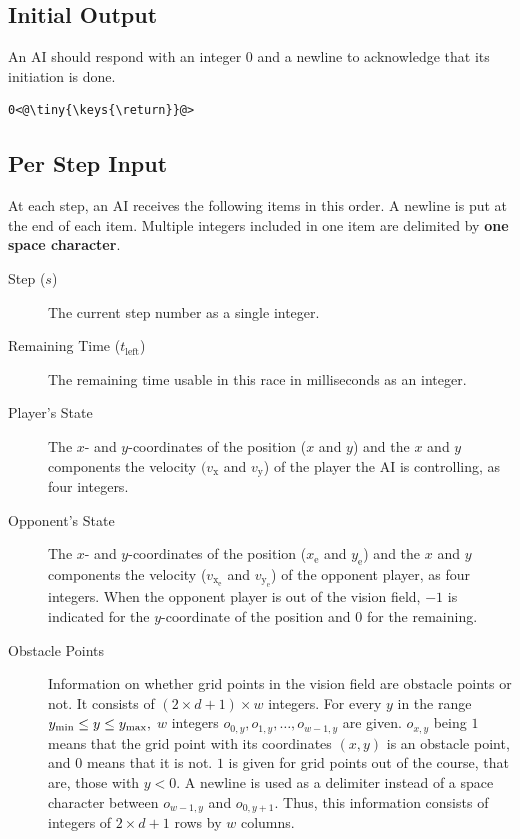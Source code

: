 \documentclass[11pt]{article}
\begin{document}
\subsection{Initial Output}\label{sec:output_init}
An AI should respond with an integer $0$ and a newline to acknowledge that its
initiation is done.

\begin{lstlisting}
0<@\tiny{\keys{\return}}@>
\end{lstlisting}

\subsection{Per Step Input}
At each step, an AI receives the following items in this order.
A newline is put at the end of each item. Multiple integers included in one item are delimited by {\bf one space character}.
\begin{description}
\item[Step ($s$)] The current step number as a single integer.
\item[Remaining Time ($t_\mathrm{left}$)] The remaining time usable in this race in
  milliseconds as an integer.
\item[Player's State] The $x$- and $y$-coordinates of the position ($x$ and $y$) and
  the $x$ and $y$ components the velocity $(v_\mathrm{x}$ and $v_\mathrm{y}$) of the player the AI is
  controlling, as four integers.
\item[Opponent's State] The $x$- and $y$-coordinates of the position ($x_\mathrm{e}$ and $y_\mathrm{e}$) and
  the $x$ and $y$ components the velocity ($v_{\mathrm{x}_\mathrm{e}}$ and $v_{\mathrm{y}_\mathrm{e}}$) of the opponent player, as
  four integers.  When the opponent player is out of the vision field,
  $-1$ is indicated for the $y$-coordinate of the position and $0$ for
  the remaining.
\item[Obstacle Points] Information on whether grid points in
  the vision field are obstacle points or not.  It consists of
  $(2\times d+1)\times w$ integers.  For every $y$ in the range
  $y_{\rm min} \le y \le y_{\rm max},$ $w$ integers $o_{0,y}, o_{1,y},
  \ldots, o_{w-1,y}$ are given.  $o_{x,y}$ being $1$ means that the
  grid point with its coordinates $(x,y)$ is an obstacle point, and
  $0$ means that it is not.  $1$ is given for grid points out of the
  course, that are, those with $y<0$.  A newline is used as a
  delimiter instead of a space character between $o_{w-1,y}$ and $o_{0,y+1}$.
  Thus, this information consists of integers of $2 \times d + 1$ rows by $w$ columns.

\end{description}
\end{document}
